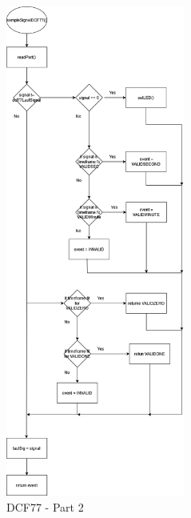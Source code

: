 \documentclass[a4paper,12pt]{article}
\begin{document}
\begin{figure}[H]
    \centering
    \includegraphics[width=0.525\textwidth]{diagrams/6.dcf772.png}
    \caption{DCF77 - Part 2}
    \label{fig:DCF772}
\end{figure}
\end{document}
